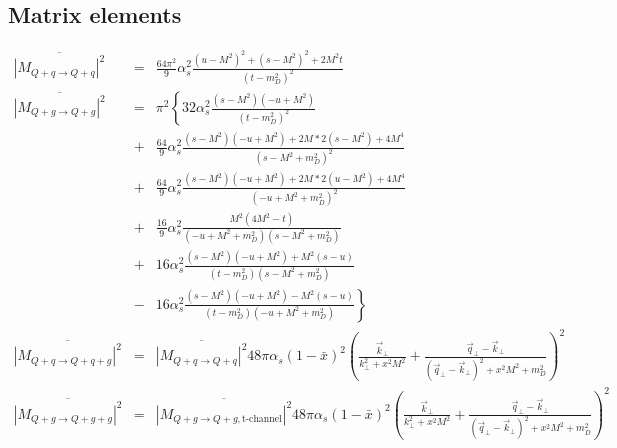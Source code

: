 \documentclass[aps, prc, reprint, amsmath, groupedaddress, nofootinbib]{revtex4-1}
\begin{document}
\begin{appendices}
\section{Matrix elements}
\label{appendix:matrix-element}
\begin{widetext}
\begin{eqnarray}
\overline{|M_{Q+q\rightarrow Q+q}|^2} &=& \frac{64\pi^2}{9}\alpha_s^2 \frac{(u-M^2)^2 + (s-M^2)^2 + 2 M^2 t}{(t-m_D^2)^2}\\
\overline{|M_{Q+g\rightarrow Q+g}|^2} &=& \pi^2 \left\{
32\alpha_s^2 \frac{(s-M^2)(-u+M^2)}{(t-m_D^2)^2} \right. \\ \nonumber
&+&\frac{64}{9}\alpha_s^2 \frac{(s-M^2)(-u+M^2)+2M*2(s-M^2) + 4M^4}{(s-M^2+m_D^2)^2} \\ \nonumber
&+&\frac{64}{9}\alpha_s^2 \frac{(s-M^2)(-u+M^2)+2M*2(u-M^2) + 4M^4}{(-u+M^2+m_D^2)^2} \\ \nonumber
&+&\frac{16}{9}\alpha_s^2 \frac{M^2(4M^2 - t)}{(-u+M^2+m_D^2)(s-M^2+m_D^2)} \\ \nonumber
&+& 16 \alpha_s^2 \frac{(s-M^2)(-u+M^2)+M^2(s-u)}{(t-m_D^2)(s-M^2+m_D^2)} \\ \nonumber
&-& \left. 16 \alpha_s^2 \frac{(s-M^2)(-u+M^2)-M^2(s-u)}{(t-m_D^2)(-u+M^2+m_D^2)}\right\} \\
\overline{|M_{Q+q\rightarrow Q+q+g}|^2} &=& \overline{|M_{Q+q\rightarrow Q+q}|^2} 48 \pi \alpha_s (1-\bar{x})^2 \left(\frac{\vec{k}_\perp}{k_\perp^2 + x^2 M^2} 
+ \frac{\vec{q}_\perp - \vec{k}_\perp}{(\vec{q}_\perp-\vec{k}_\perp)^2 + x^2 M^2 + m_D^2}
\right)^2 \\
\overline{|M_{Q+g\rightarrow Q+g+g}|^2} &=& \overline{|M_{Q+g\rightarrow Q+g, \textrm{t-channel}}|^2} 48 \pi \alpha_s (1-\bar{x})^2 \left(\frac{\vec{k}_\perp}{k_\perp^2 + x^2 M^2} 
+ \frac{\vec{q}_\perp - \vec{k}_\perp}{(\vec{q}_\perp-\vec{k}_\perp)^2 + x^2 M^2 + m_D^2}
\right)^2 
\end{eqnarray}
\end{widetext}


\end{appendices}
\end{document}
